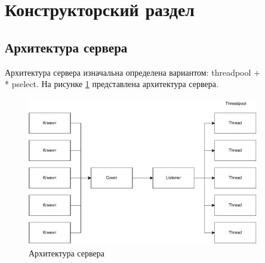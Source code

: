\section{Конструкторский раздел}

\subsection{Архитектура сервера}

Архитектура сервера изначальна определена вариантом: threadpool + \\* pselect. На рисунке \ref{fig:arch} представлена архитектура сервера.

\begin{figure}[h!btp]
	\centering
	\includegraphics[width=0.9\textwidth]{inc/arch.pdf}
	\caption{Архитектура сервера}
	\label{fig:arch}
\end{figure}

\clearpage
